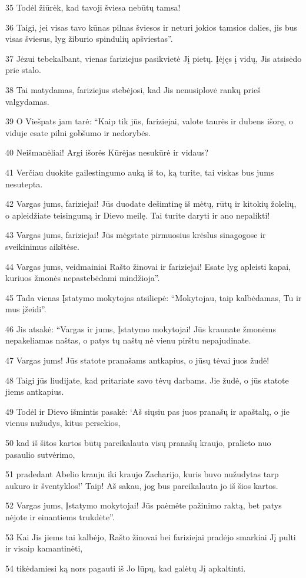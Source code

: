 \par 35 Todėl žiūrėk, kad tavoji šviesa nebūtų tamsa! 
\par 36 Taigi, jei visas tavo kūnas pilnas šviesos ir neturi jokios tamsios dalies, jis bus visas šviesus, lyg žiburio spindulių apšviestas”. 
\par 37 Jėzui tebekalbant, vienas fariziejus pasikvietė Jį pietų. Įėjęs į vidų, Jis atsisėdo prie stalo. 
\par 38 Tai matydamas, fariziejus stebėjosi, kad Jis nenusiplovė rankų prieš valgydamas. 
\par 39 O Viešpats jam tarė: “Kaip tik jūs, fariziejai, valote taurės ir dubens išorę, o viduje esate pilni gobšumo ir nedorybės. 
\par 40 Neišmanėliai! Argi išorės Kūrėjas nesukūrė ir vidaus? 
\par 41 Verčiau duokite gailestingumo auką iš to, ką turite, tai viskas bus jums nesutepta. 
\par 42 Vargas jums, fariziejai! Jūs duodate dešimtinę iš mėtų, rūtų ir kitokių žolelių, o apleidžiate teisingumą ir Dievo meilę. Tai turite daryti ir ano nepalikti! 
\par 43 Vargas jums, fariziejai! Jūs mėgstate pirmuosius krėslus sinagogose ir sveikinimus aikštėse. 
\par 44 Vargas jums, veidmainiai Rašto žinovai ir fariziejai! Esate lyg apleisti kapai, kuriuos žmonės nepastebėdami mindžioja”. 
\par 45 Tada vienas Įstatymo mokytojas atsiliepė: “Mokytojau, taip kalbėdamas, Tu ir mus įžeidi”. 
\par 46 Jis atsakė: “Vargas ir jums, Įstatymo mokytojai! Jūs kraunate žmonėms nepakeliamas naštas, o patys tų naštų nė vienu pirštu nepajudinate. 
\par 47 Vargas jums! Jūs statote pranašams antkapius, o jūsų tėvai juos žudė! 
\par 48 Taigi jūs liudijate, kad pritariate savo tėvų darbams. Jie žudė, o jūs statote jiems antkapius. 
\par 49 Todėl ir Dievo išmintis pasakė: ‘Aš siųsiu pas juos pranašų ir apaštalų, o jie vienus nužudys, kitus persekios, 
\par 50 kad iš šitos kartos būtų pareikalauta visų pranašų kraujo, pralieto nuo pasaulio sutvėrimo, 
\par 51 pradedant Abelio krauju iki kraujo Zacharijo, kuris buvo nužudytas tarp aukuro ir šventyklos!’ Taip! Aš sakau, jog bus pareikalauta jo iš šios kartos. 
\par 52 Vargas jums, Įstatymo mokytojai! Jūs paėmėte pažinimo raktą, bet patys nėjote ir einantiems trukdėte”. 
\par 53 Kai Jis jiems tai kalbėjo, Rašto žinovai bei fariziejai pradėjo smarkiai Jį pulti ir visaip kamantinėti, 
\par 54 tikėdamiesi ką nors pagauti iš Jo lūpų, kad galėtų Jį apkaltinti.



